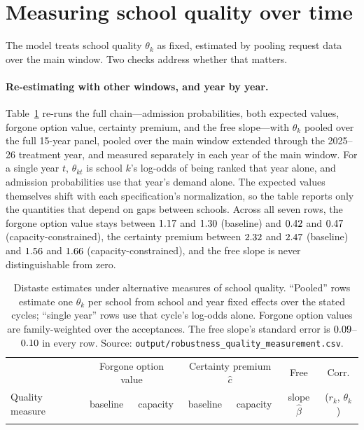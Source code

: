 \documentclass{article}
\begin{document}
\section{Measuring school quality over time}
\label{sec:quality-over-time}
The model treats school quality $\theta_k$ as fixed, estimated by pooling request data over the main window. Two checks address whether that matters.

\paragraph{Re-estimating with other windows, and year by year.} Table~\ref{tab:robustness} re-runs the full chain---admission probabilities, both expected values, forgone option value, certainty premium, and the free slope---with $\theta_k$ pooled over the full 15-year panel, pooled over the main window extended through the 2025--26 treatment year, and measured separately in each year of the main window. For a single year $t$, $\theta_{kt}$ is school $k$'s log-odds of being ranked that year alone, and admission probabilities use that year's demand alone. The expected values themselves shift with each specification's normalization, so the table reports only the quantities that depend on gaps between schools. Across all seven rows, the forgone option value stays between $1.17$ and $1.30$ (baseline) and $0.42$ and $0.47$ (capacity-constrained), the certainty premium between $2.32$ and $2.47$ (baseline) and $1.56$ and $1.66$ (capacity-constrained), and the free slope is never distinguishable from zero.

\begin{table}
\centering
\small
\begin{tabular}{lcccccc}
 & \multicolumn{2}{c}{Forgone option value} & \multicolumn{2}{c}{Certainty premium $\hat c$} & Free & Corr. \\
Quality measure & baseline & capacity & baseline & capacity & slope $\hat\beta$ & ($r_k$, $\theta_k$) \\ \hline
{}{robustness}
\end{tabular}
\caption{Distaste estimates under alternative measures of school quality. ``Pooled'' rows estimate one $\theta_k$ per school from school and year fixed effects over the stated cycles; ``single year'' rows use that cycle's log-odds alone. Forgone option values are family-weighted over the \numPromoted{} acceptances. The free slope's standard error is $0.09$--$0.10$ in every row. Source: \texttt{output/robustness\_quality\_measurement.csv}.}
\label{tab:robustness}
\end{table}
\end{document}
